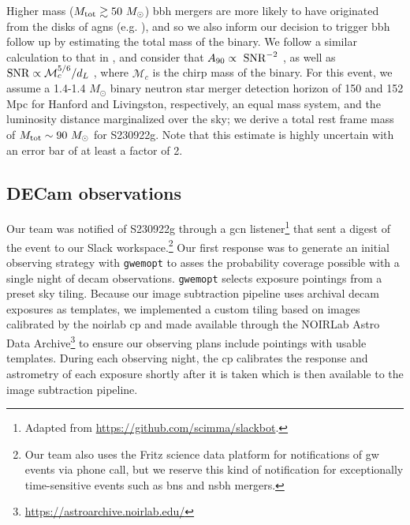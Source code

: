 \documentclass[twocolumn]{aastex631}
\newcommand{\gweventid}{S230922g\xspace}
\newcommand{\gwemopt}{\texttt{gwemopt}\xspace}
\begin{document}
Higher mass ($M_{\rm tot} \gtrsim 50~M_\odot$) \gls{bbh} mergers are more likely to have originated from the disks of \glspl{agn} (e.g. \citealt{Gayathri_2021}), and so we also inform our decision to trigger \gls{bbh} follow up by estimating the total mass of the binary.
We follow a similar calculation to that in \citet{grahamCandidateElectromagneticCounterpart2020}, and consider that $A_{90}\propto~{\rm SNR}^{-2}$ \citep{Berry_2015}, as well as ${\rm SNR}\propto \mathcal{M}_c^{5/6}/d_L$ \citep{Finn_1993}, where $\mathcal{M}_c$ is the chirp mass of the binary.
For this event, we assume a 1.4-1.4 $M_\odot$ binary neutron star merger detection horizon of 150 and 152 Mpc for Hanford and Livingston, respectively, an equal mass system, and the luminosity distance marginalized over the sky; we derive a total rest frame mass of $M_{\rm tot} \sim 90~M_\odot$ for \gweventid.
Note that this estimate is highly uncertain with an error bar of at least a factor of 2.

\subsection{DECam observations}\label{subsec:observations}

Our team was notified of \gweventid through a \gls{gcn} listener\footnote{Adapted from \url{https://github.com/scimma/slackbot}.} that sent a digest of the event to our Slack workspace.\footnote{Our team also uses the Fritz science data platform \citep{coughlinDataSciencePlatform2023} for notifications of \gls{gw} events via phone call, but we reserve this kind of notification for exceptionally time-sensitive events such as \gls{bns} and \gls{ns}\gls{bh} mergers.}
Our first response was to generate an initial observing strategy with \gwemopt \citep{coughlinOptimizingSearchesElectromagnetic2018} to asses the probability coverage possible with a single night of \gls{decam} observations.
\gwemopt selects exposure pointings from a preset sky tiling.
Because our image subtraction pipeline uses archival \gls{decam} exposures as templates, we implemented a custom tiling based on images calibrated by the \gls{noirlab} \gls{cp} \citep{2014ASPC..485..379V} and made available through the NOIRLab Astro Data Archive\footnote{\url{https://astroarchive.noirlab.edu/}} \citep{2021Mirro...2...33M} to ensure our observing plans include pointings with usable templates.
During each observing night, the \gls{cp} calibrates the response and astrometry of each exposure shortly after it is taken which is then available to the image subtraction pipeline.
\end{document}
